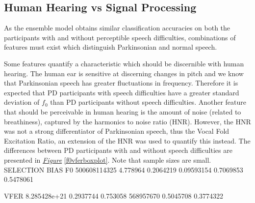 \documentclass[12pt, twoside]{book}
\begin{document}
\subsection{Human Hearing vs Signal Processing}
\label{formalfeatures}
As the ensemble model obtains similar classification accuracies on both the participants with and without perceptible speech difficulties, combinations of features must exist which distinguish Parkinsonian and normal speech. 

Some features quantify a characteristic which should be discernible with human hearing. The human ear is sensitive at discerning changes in pitch and we know that Parkinsonian speech has greater fluctuations in frequency. Therefore it is expected that PD participants with speech difficulties have a greater standard deviation of $f_0$ than PD participants without speech difficulties. Another feature that should be perceivable in human hearing is the amount of noise (related to breathiness), captured by the harmonics to noise ratio (HNR). However, the HNR was not a strong differentiator of Parkinsonian speech, thus the Vocal Fold Excitation Ratio, an extension of the HNR was used to quantify this instead. The differences between PD participants with and without speech difficulties are presented in \textit{\hyperref[f0vferboxplot]{Figure}} \ref{f0vferboxplot}. Note that sample sizes are small.
SELECTION BIAS
F0
500608114325 4.778964 0.2064219
0.09593154 0.7069853 0.5478061

VFER
8.285428e+21 0.2937744 0.753058
568957670 0.5045708 0.3774322
\end{document}
